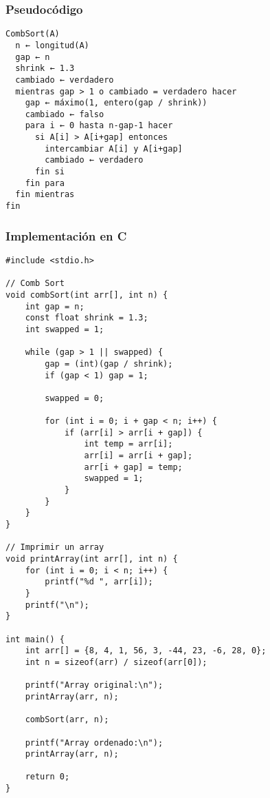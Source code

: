 \documentclass[11pt,openany]{book}
\begin{document}
\subsubsection{Pseudocódigo}
\begin{verbatim}
CombSort(A)
  n ← longitud(A)
  gap ← n
  shrink ← 1.3
  cambiado ← verdadero
  mientras gap > 1 o cambiado = verdadero hacer
    gap ← máximo(1, entero(gap / shrink))
    cambiado ← falso
    para i ← 0 hasta n-gap-1 hacer
      si A[i] > A[i+gap] entonces
        intercambiar A[i] y A[i+gap]
        cambiado ← verdadero
      fin si
    fin para
  fin mientras
fin
\end{verbatim}


\subsubsection{Implementación en C}
\lstset{language=C}
\begin{lstlisting}
#include <stdio.h>

// Comb Sort
void combSort(int arr[], int n) {
    int gap = n;
    const float shrink = 1.3;
    int swapped = 1;

    while (gap > 1 || swapped) {
        gap = (int)(gap / shrink);
        if (gap < 1) gap = 1;

        swapped = 0;

        for (int i = 0; i + gap < n; i++) {
            if (arr[i] > arr[i + gap]) {
                int temp = arr[i];
                arr[i] = arr[i + gap];
                arr[i + gap] = temp;
                swapped = 1;
            }
        }
    }
}

// Imprimir un array
void printArray(int arr[], int n) {
    for (int i = 0; i < n; i++) {
        printf("%d ", arr[i]);
    }
    printf("\n");
}

int main() {
    int arr[] = {8, 4, 1, 56, 3, -44, 23, -6, 28, 0};
    int n = sizeof(arr) / sizeof(arr[0]);

    printf("Array original:\n");
    printArray(arr, n);

    combSort(arr, n);

    printf("Array ordenado:\n");
    printArray(arr, n);

    return 0;
}
\end{lstlisting}
\end{document}
